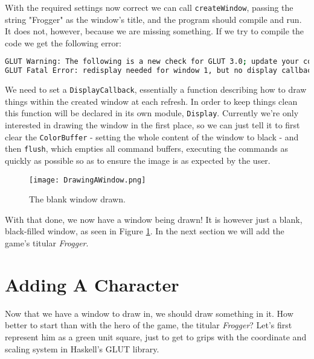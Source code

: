 \documentclass[12pt, a4paper]{report}
\begin{document}
\par

With the required settings now correct we can call \verb|createWindow|, passing the string "Frogger" as the window's title, and the program should compile and run.
It does not, however, because we are missing something.
If we try to compile the code we get the following error:

\begin{lstlisting}[language=sh, xleftmargin=-0.1\textwidth, xrightmargin=-0.1\textwidth]
GLUT Warning: The following is a new check for GLUT 3.0; update your code.
GLUT Fatal Error: redisplay needed for window 1, but no display callback.
\end{lstlisting}

We need to set a \verb|DisplayCallback|, essentially a function describing how to draw things within the created window at each refresh.
In order to keep things clean this function will be declared in its own module, \verb|Display|.
Currently we're only interested in drawing the window in the first place, so we can just tell it to first clear the \verb|ColorBuffer| - setting the whole content of the window to black - and then \verb|flush|, which empties all command buffers, executing the commands as quickly as possible so as to ensure the image is as expected by the user.

\par

\begin{figure}[ht]
  \centering
  \caption{The blank window drawn.}
  \texttt{[image: DrawingAWindow.png]}
  \label{fig:drawingawindow}
\end{figure}

With that done, we now have a window being drawn!
It is however just a blank, black-filled window, as seen in Figure \ref{fig:drawingawindow}.
In the next section we will add the game's titular \textit{Frogger}.

\section{Adding A Character}

Now that we have a window to draw in, we should draw something in it.
How better to start than with the hero of the game, the titular \textit{Frogger}?
Let's first represent him as a green unit square, just to get to grips with the coordinate and scaling system in Haskell's GLUT library.

\par
\end{document}
